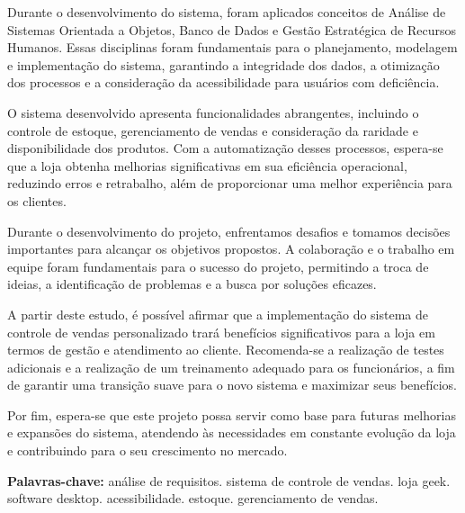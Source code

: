\documentclass[
	12pt,				%
	openright,			%
	twoside,			%
	a4paper,			%
	english,			%
	brazil				%
	]{abntex2}
\begin{document}
Durante o desenvolvimento do sistema, foram aplicados conceitos de Análise de Sistemas Orientada a Objetos, Banco de Dados e Gestão Estratégica de Recursos Humanos. Essas disciplinas foram fundamentais para o planejamento, modelagem e implementação do sistema, garantindo a integridade dos dados, a otimização dos processos e a consideração da acessibilidade para usuários com deficiência.

O sistema desenvolvido apresenta funcionalidades abrangentes, incluindo o controle de estoque, gerenciamento de vendas e consideração da raridade e disponibilidade dos produtos. Com a automatização desses processos, espera-se que a loja obtenha melhorias significativas em sua eficiência operacional, reduzindo erros e retrabalho, além de proporcionar uma melhor experiência para os clientes.

Durante o desenvolvimento do projeto, enfrentamos desafios e tomamos decisões importantes para alcançar os objetivos propostos. A colaboração e o trabalho em equipe foram fundamentais para o sucesso do projeto, permitindo a troca de ideias, a identificação de problemas e a busca por soluções eficazes.

A partir deste estudo, é possível afirmar que a implementação do sistema de controle de vendas personalizado trará benefícios significativos para a loja em termos de gestão e atendimento ao cliente. Recomenda-se a realização de testes adicionais e a realização de um treinamento adequado para os funcionários, a fim de garantir uma transição suave para o novo sistema e maximizar seus benefícios.

Por fim, espera-se que este projeto possa servir como base para futuras melhorias e expansões do sistema, atendendo às necessidades em constante evolução da loja e contribuindo para o seu crescimento no mercado.

\vspace{\baselineskip}

\noindent
\textbf{Palavras-chave:} análise de requisitos. sistema de controle de vendas. loja geek. software desktop. acessibilidade. estoque. gerenciamento de vendas.

\postextual


\end{document}
